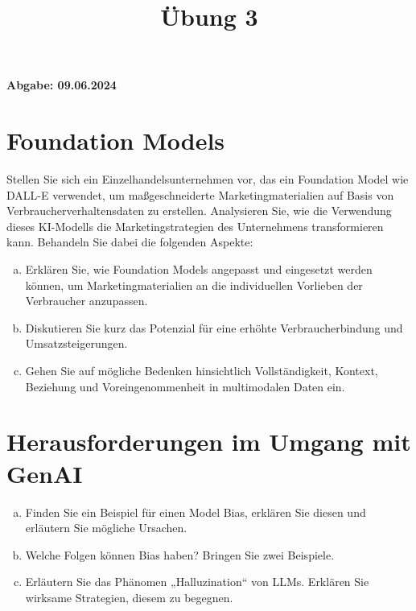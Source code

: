 \documentclass[12pt,ngerman]{AssignmentClass}
\title{Übung 3} %
\begin{document}
	\maketitle

    \noindent %
    \begin{tcolorbox}[colback=gray!20, %
                      colframe=gray!20, %
                      boxrule=0pt, %
                      sharp corners, %
                      valign=center, %
                      halign=center, %
                      height=2cm] %
    \LARGE \bfseries Abgabe: 09.06.2024 %
    \end{tcolorbox}
	
    \section{Foundation Models}
        Stellen Sie sich ein Einzelhandelsunternehmen vor, das ein Foundation Model wie DALL-E verwendet, um maßgeschneiderte Marketingmaterialien auf Basis von Verbraucherverhaltensdaten zu erstellen. Analysieren Sie, wie die Verwendung dieses KI-Modells die Marketingstrategien des Unternehmens transformieren kann. Behandeln Sie dabei die folgenden Aspekte:

        \begin{enumerate}[a)]
    		\item Erklären Sie, wie Foundation Models angepasst und eingesetzt werden können, um Marketingmaterialien an die individuellen Vorlieben der Verbraucher anzupassen.
    		\item Diskutieren Sie kurz das Potenzial für eine erhöhte Verbraucherbindung und Umsatzsteigerungen.
    		\item Gehen Sie auf mögliche Bedenken hinsichtlich Vollständigkeit, Kontext, Beziehung und Voreingenommenheit in multimodalen Daten ein.
    	\end{enumerate}

    
    \section{Herausforderungen im Umgang mit GenAI}
        \begin{enumerate}[a)]
            \item Finden Sie ein Beispiel für einen Model Bias, erklären Sie diesen und erläutern Sie mögliche Ursachen.
            \item Welche Folgen können Bias haben? Bringen Sie zwei Beispiele.
            \item Erläutern Sie das Phänomen „Halluzination“ von LLMs. Erklären Sie wirksame Strategien, diesem zu begegnen. 
        \end{enumerate}
\end{document}
